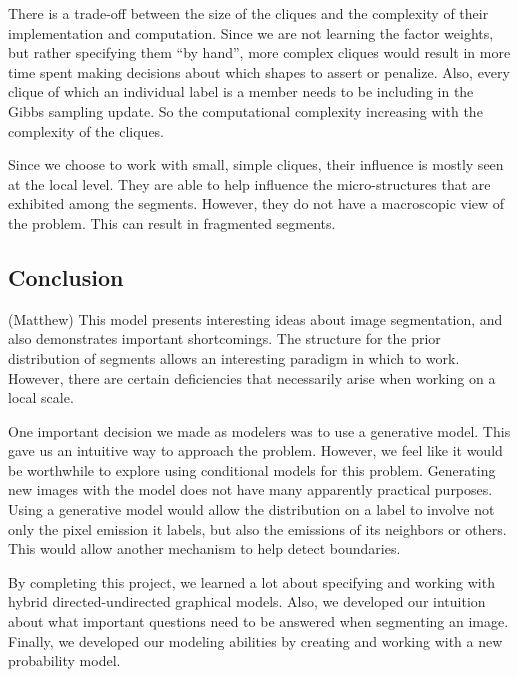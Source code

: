 \documentclass[12pt]{article}
\begin{document}
There is a trade-off between the size of the cliques and the complexity of their
implementation and computation. Since we are not learning the factor weights,
but rather specifying them ``by hand'', more complex cliques would result in
more time spent making decisions about which shapes to assert or penalize.
Also, every clique of which an individual label is a member needs to be
including in the Gibbs sampling update. So the computational complexity
increasing with the complexity of the cliques.

Since we choose to work with small, simple cliques, their influence is mostly
seen at the local level. They are able to help influence the micro-structures
that are exhibited among the segments. However, they do not have a macroscopic
view of the problem. This can result in fragmented segments.

\subsection*{Conclusion} (Matthew)
This model presents interesting ideas about image segmentation, and also
demonstrates important shortcomings. The structure for the prior distribution
of segments allows an interesting paradigm in which to work. However, there are
certain deficiencies that necessarily arise when working on a local scale.

One important decision we made as modelers was to use a generative model. This
gave us an intuitive way to approach the problem. However, we feel like it
would be worthwhile to explore using conditional models for this problem.
Generating new images with the model does not have many apparently practical
purposes. Using a generative model would allow the distribution on a label to
involve not only the pixel emission it labels, but also the emissions of its
neighbors or others. This would allow another mechanism to help detect
boundaries.

By completing this project, we learned a lot about specifying and working with
hybrid directed-undirected graphical models. Also, we developed our intuition
about what important questions need to be answered when segmenting an image.
Finally, we developed our modeling abilities by creating and working with a new
probability model.
\end{document}
